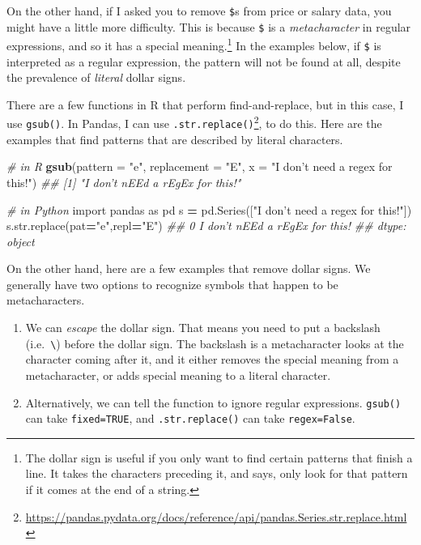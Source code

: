 \documentclass[12pt,krantz2]{krantz}
\makeatletter
\newenvironment{Shaded}{\begin{snugshade}}{\end{snugshade}}
\newcommand{\BuiltInTok}[1]{#1}
\newcommand{\CommentTok}[1]{\textcolor[rgb]{0.37,0.37,0.37}{\textit{#1}}}
\newcommand{\DataTypeTok}[1]{\textcolor[rgb]{0.27,0.27,0.27}{#1}}
\newcommand{\ImportTok}[1]{#1}
\newcommand{\KeywordTok}[1]{\textcolor[rgb]{0.27,0.27,0.27}{\textbf{#1}}}
\newcommand{\NormalTok}[1]{#1}
\newcommand{\OperatorTok}[1]{\textcolor[rgb]{0.43,0.43,0.43}{\textbf{#1}}}
\newcommand{\StringTok}[1]{\textcolor[rgb]{0.5,0.5,0.5}{#1}}
\providecommand{\tightlist}{%
  \setlength{\itemsep}{0pt}\setlength{\parskip}{0pt}}
\renewcommand{\href}[2]{#2\footnote{\url{#1}}}
\newenvironment{kframe}{%
\medskip{}
\setlength{\fboxsep}{.8em}
 \def\at@end@of@kframe{}%
 \ifinner\ifhmode%
  \def\at@end@of@kframe{\end{minipage}}%
  \begin{minipage}{\columnwidth}%
 \fi\fi%
 \def\FrameCommand##1{\hskip\@totalleftmargin \hskip-\fboxsep
 \colorbox{shadecolor}{##1}\hskip-\fboxsep
     \hskip-\linewidth \hskip-\@totalleftmargin \hskip\columnwidth}%
 \MakeFramed {\advance\hsize-\width
   \@totalleftmargin\z@ \linewidth\hsize
   \@setminipage}}%
 {\par\unskip\endMakeFramed%
 \at@end@of@kframe}
\renewenvironment{Shaded}{\begin{kframe}}{\end{kframe}}
\makeatother
\begin{document}
On the other hand, if I asked you to remove \texttt{\$}s from price or salary data, you might have a little more difficulty. This is because \texttt{\$} is a \emph{metacharacter} in regular expressions, and so it has a special meaning.\footnote{The dollar sign is useful if you only want to find certain patterns that finish a line. It takes the characters preceding it, and says, only look for that pattern if it comes at the end of a string.} In the examples below, if \texttt{\$} is interpreted as a regular expression, the pattern will not be found at all, despite the prevalence of \emph{literal} dollar signs.

There are a few functions in R that perform find-and-replace, but in this case, I use \texttt{gsub()}. In Pandas, I can use \href{https://pandas.pydata.org/docs/reference/api/pandas.Series.str.replace.html}{\texttt{.str.replace()}}, to do this. Here are the examples that find patterns that are described by literal characters.

\begin{Shaded}
\begin{Highlighting}[]
\CommentTok{# in R}
\KeywordTok{gsub}\NormalTok{(}\DataTypeTok{pattern =} \StringTok{"e"}\NormalTok{, }\DataTypeTok{replacement =} \StringTok{"E"}\NormalTok{, }
     \DataTypeTok{x =} \StringTok{"I don't need a regex for this!"}\NormalTok{)}
\CommentTok{## [1] "I don't nEEd a rEgEx for this!"}
\end{Highlighting}
\end{Shaded}

\begin{Shaded}
\begin{Highlighting}[]
\CommentTok{# in Python}
\ImportTok{import}\NormalTok{ pandas }\ImportTok{as}\NormalTok{ pd}
\NormalTok{s }\OperatorTok{=}\NormalTok{ pd.Series([}\StringTok{"I don't need a regex for this!"}\NormalTok{])}
\NormalTok{s.}\BuiltInTok{str}\NormalTok{.replace(pat}\OperatorTok{=}\StringTok{"e"}\NormalTok{,repl}\OperatorTok{=}\StringTok{"E"}\NormalTok{)}
\CommentTok{## 0    I don't nEEd a rEgEx for this!}
\CommentTok{## dtype: object}
\end{Highlighting}
\end{Shaded}

On the other hand, here are a few examples that remove dollar signs. We generally have two options to recognize symbols that happen to be metacharacters.

\begin{enumerate}
\def\labelenumi{\arabic{enumi}.}
\tightlist
\item
  We can \emph{escape} the dollar sign. That means you need to put a backslash (i.e.~\texttt{\textbackslash{}}) before the dollar sign. The backslash is a metacharacter looks at the character coming after it, and it either removes the special meaning from a metacharacter, or adds special meaning to a literal character.
\item
  Alternatively, we can tell the function to ignore regular expressions. \texttt{gsub()} can take \texttt{fixed=TRUE}, and \texttt{.str.replace()} can take \texttt{regex=False}.
\end{enumerate}
\end{document}
